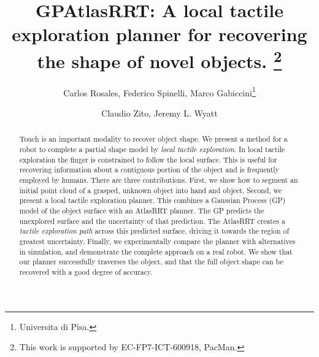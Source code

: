 \documentclass{ws-ijhr}
\begin{document}

%
\catchline{}{}{}{}{}
%

\title{GPAtlasRRT: A local tactile exploration planner for recovering the shape of novel objects.
  \thanks{This work is supported by EC-FP7-ICT-600918, PacMan.}}

\author{Carlos Rosales, Federico Spinelli, Marco Gabiccini\footnote{Universita di Pisa.}}

\address{Centro di Ricerca E. Piaggio, Univ. di Pisa, Pisa, Italy.\\
carlos.rosales@for.unipi.it}

\author{Claudio Zito, Jeremy L. Wyatt}

\address{IRLab, CN-CR, School of Computer Science\\
University of Birmingham, Birmingham, B15 2TT, UK\\
\{C.Zito, J.L.Wyatt\}@cs.bham.ac.uk}

\maketitle

\begin{history}
\end{history}

\begin{abstract}
Touch is an important modality to recover object shape. We present a method for a robot to complete a partial shape model by {\em local tactile exploration}.  In local tactile exploration the finger is constrained to follow the local surface. This is useful for recovering information about a contiguous portion of the object and is frequently employed by humans. There are three contributions. First, we show how to segment an initial point cloud of a grasped, unknown object into hand and object. Second, we present a local tactile exploration planner. This combines a Gaussian Process (GP) model of the object surface with an AtlasRRT planner. The GP predicts the unexplored surface and the uncertainty of that prediction. The AtlasRRT creates a {\em tactile exploration path} across this predicted surface, driving it towards the region of greatest uncertainty. Finally, we experimentally compare the planner with alternatives in simulation, and demonstrate the complete approach on a real robot. We show that our planner successfully traverses the object, and that the full object shape can be recovered with a good degree of accuracy.


\end{abstract}
\end{document}
